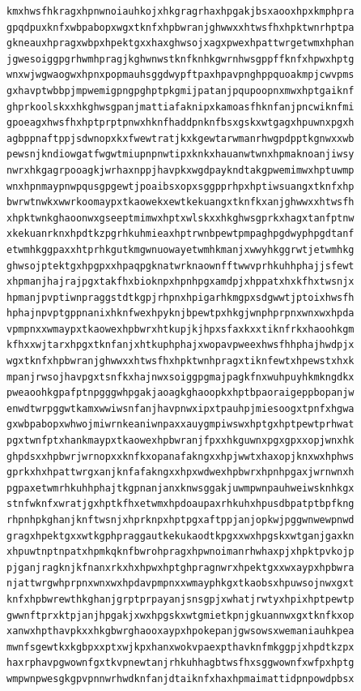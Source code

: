 \documentclass[11pt,letterpaper]{exam}
\begin{document}
\begin{questions}
\begin{verbatim}
kmxhwsfhkragxhpnwnoiauhkojxhkgragrhaxhpgakjbsxaooxhpxkmphpra
gpqdpuxknfxwbpabopxwgxtknfxhpbwranjghwwxxhtwsfhxhpktwnrhptpa
gkneauxhpragxwbpxhpektgxxhaxghwsojxagxpwexhpattwrgetwmxhphan
jgwesoiggpgrhwmhpragjkghwnwstknfknhkgwrnhwsgppffknfxhpwxhptg
wnxwjwgwaogwxhpnxpopmauhsggdwypftpaxhpavpnghppquoakmpjcwvpms
gxhavptwbbpjmpwemigpngpghptpkgmijpatanjpqupoopnxmwxhptgaiknf
ghprkoolskxxhkghwsgpanjmattiafaknipxkamoasfhknfanjpncwiknfmi
gpoeagxhwsfhxhptprptpnwxhknfhaddpnknfbsxgskxwtgagxhpuwnxpgxh
agbppnaftppjsdwnopxkxfwewtratjkxkgewtarwmanrhwgpdpptkgnwxxwb
pewsnjkndiowgatfwgwtmiupnpnwtipxknkxhauanwtwnxhpmaknoanjiwsy
nwrxhkgagrpooagkjwrhaxnppjhavpkxwgdpaykndtakgpwemimwxhptuwmp
wnxhpnmaypnwpqusgpgewtjpoaibsxopxsggpprhpxhptiwsuangxtknfxhp
bwrwtnwkxwwrkoomaypxtkaowekxewtkekuangxtknfkxanjghwwxxhtwsfh
xhpktwnkghaoonwxgseeptmimwxhptxwlskxxhkghwsgprkxhagxtanfptnw
xkekuanrknxhpdtkzpgrhkuhmieaxhptrwnbpewtpmpaghpgdwyphpgdtanf
etwmhkggpaxxhtprhkgutkmgwnuowayetwmhkmanjxwwyhkggrwtjetwmhkg
ghwsojptektgxhpgpxxhpaqpgknatwrknaownfftwwvprhkuhhphajjsfewt
xhpmanjhajrajpgxtakfhxbioknpxhpnhpgxamdpjxhppatxhxkfhxtwsnjx
hpmanjpvptiwnpraggstdtkgpjrhpnxhpigarhkmgpxsdgwwtjptoixhwsfh
hphajnpvptgppnanixhknfwexhpyknjbpewtpxhkgjwnphprpnxwnxwxhpda
vpmpnxxwmaypxtkaowexhpbwrxhtkupjkjhpxsfaxkxxtiknfrkxhaoohkgm
kfhxxwjtarxhpgxtknfanjxhtkuphphajxwopavpweexhwsfhhphajhwdpjx
wgxtknfxhpbwranjghwwxxhtwsfhxhpktwnhpragxtiknfewtxhpewstxhxk
mpanjrwsojhavpgxtsnfkxhajnwxsoiggpgmajpagkfnxwuhpuyhkmkngdkx
pweaoohkgpafptnpgggwhpgakjaoagkghaoopkxhptbpaoraigeppbopanjw
enwdtwrpggwtkamxwwiwsnfanjhavpnwxipxtpauhpjmiesoogxtpnfxhgwa
gxwbpabopxwhwojmiwrnkeaniwnpaxxauygmpiwswxhptgxhptpewtprhwat
pgxtwnfptxhankmaypxtkaowexhpbwranjfpxxhkguwnxpgxgpxxopjwnxhk
ghpdsxxhpbwrjwrnopxxknfkxopanafakngxxhpjwwtxhaxopjknxwxhphws
gprkxhxhpattwrgxanjknfafakngxxhpxwdwexhpbwrxhpnhpgaxjwrnwnxh
pgpaxetwmrhkuhhphajtkgpnanjanxknwsggakjuwmpwnpauhweiwsknhkgx
stnfwknfxwratjgxhptkfhxetwmxhpdoaupaxrhkuhxhpusdbpatptbpfkng
rhpnhpkghanjknftwsnjxhprknpxhptpgxaftppjanjopkwjpggwnwewpnwd
gragxhpektgxxwtkgphpraggautkekukaodtkpgxxwxhpgskxwtganjgaxkn
xhpuwtnptnpatxhpmkqknfbwrohpragxhpwnoimanrhwhaxpjxhpktpvkojp
pjganjragknjkfnanxrkxhxhpwxhptghpragnwrxhpektgxxwxaypxhpbwra
njattwrgwhprpnxwnxwxhpdavpmpnxxwmayphkgxtkaobsxhpuwsojnwxgxt
knfxhpbwrewthkghanjgrptprpayanjsnsgpjxwhatjrwtyxhpixhptpewtp
gwwnftprxktpjanjhpgakjxwxhpgskxwtgmietkpnjgkuannwxgxtknfkxop
xanwxhpthavpkxxhkgbwrghaooxaypxhpokepanjgwsowsxwemaniauhkpea
mwnfsgewtkxkgbpxxptxwjkpxhanxwokvpaexpthavknfmkggpjxhpdtkzpx
haxrphavpgwownfgxtkvpnewtanjrhkuhhagbtwsfhxsggwownfxwfpxhptg
wmpwnpwesgkgpvpnnwrhwdknfanjdtaiknfxhaxhpmaimattidpnpowdpbsx

\end{verbatim}
\end{questions}
\end{document}
